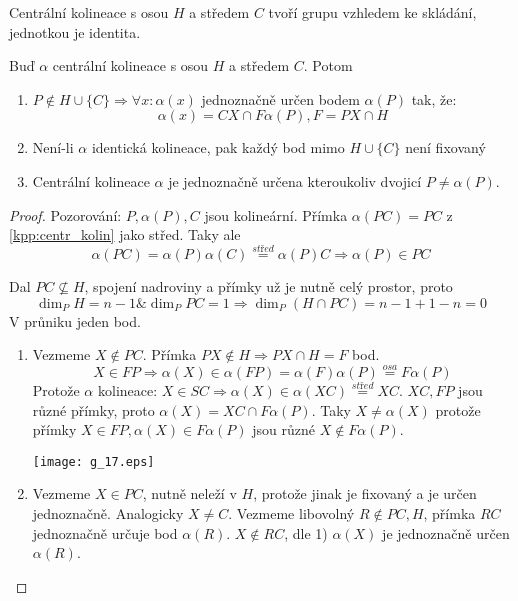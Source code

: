 \begin{lemma}
    Centrální kolineace s osou $H$ a středem $C$ tvoří grupu vzhledem ke skládání, jednotkou je identita.
\end{lemma}

\begin{lemma}
    Buď $\alpha$ centrální kolineace s osou $H$ a středem $C$. Potom
    \begin{enumerate}
        \item $P\not\in H\cup\{C\}\Rightarrow \forall x: \alpha(x)$ jednoznačně určen bodem $\alpha(P)$ tak, že:
		\[ \alpha(x)=CX\cap F\alpha(P), F=PX\cap H \]
        \item Není-li $\alpha$ identická kolineace, pak každý bod mimo $H\cup \{C\}$ není fixovaný
        \item Centrální kolineace $\alpha$ je jednoznačně určena kteroukoliv dvojicí $P\neq\alpha(P)$.
    \end{enumerate}
\end{lemma}
\begin{proof}
	Pozorování: $P, \alpha(P), C$ jsou kolineární.
	Přímka $\alpha(PC) = PC$ z \cref{kpp:centr_kolin} jako střed.
	Taky ale
	\[ \alpha(PC) = \alpha(P)\alpha(C) \stackrel{střed}{=} \alpha(P) C \Rightarrow \alpha(P) \in PC \]

	Dal $PC \nsubseteq H$, spojení nadroviny a přímky už je nutně celý prostor, proto
	\[ \dim_P H = n - 1 \& \dim_P PC = 1 \Rightarrow \dim_P (H \cap PC) = n - 1 + 1 - n = 0 \]
	V průniku jeden bod.

    \begin{enumerate}
	    \item Vezmeme $X \notin PC$.
		    Přímka $PX \notin H \Rightarrow PX \cap H = F$ bod.
		    \[ X \in FP \Rightarrow \alpha(X) \in \alpha(FP) = \alpha(F)\alpha(P) \stackrel{osa}{=} F\alpha(P) \]
		    Protože $\alpha$ kolineace: $X \in SC \Rightarrow \alpha(X) \in \alpha(XC) \stackrel{střed}{=} XC$.
		    $XC, FP$ jsou různé přímky, proto $\alpha(X) = XC \cap F\alpha(P)$.
		    Taky $X \ne \alpha(X)$ protože přímky $X \in FP, \alpha(X) \in F\alpha(P)$ jsou různé $X \notin F\alpha(P)$.

    	\texttt{[image: g\_17.eps]}
\item Vezmeme $X \in PC$, nutně neleží v $H$, protože jinak je fixovaný a je určen jednoznačně.
	Analogicky $X \ne C$.
	Vezmeme libovolný $R \notin PC, H$, přímka $RC$ jednoznačně určuje bod $\alpha(R)$.
	$X \notin RC$, dle 1) $\alpha(X)$ je jednoznačně určen $\alpha(R)$.
    \end{enumerate}
\end{proof}

